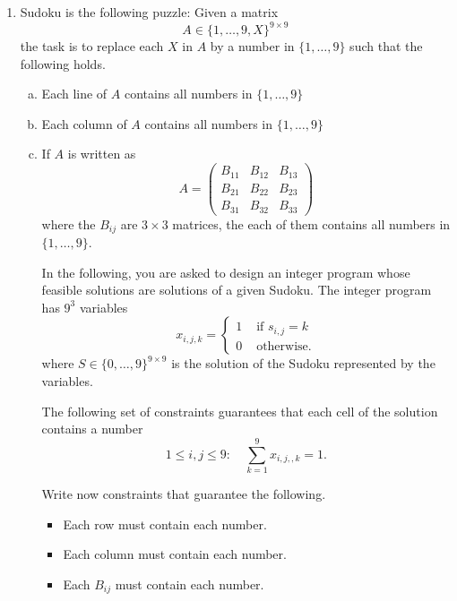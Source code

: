 \documentclass[11pt]{article}
\institute{\'Ecole Polytechnique F\'ed\'erale de Lausanne}
\begin{document}
\makeheader

\begin{enumerate}[1)]


\item Sudoku is the following puzzle: Given a matrix
  \begin{displaymath}
    A ∈ \{1,\dots,9,X\}^{9 ×9} 
  \end{displaymath}
  the task is to replace each $X$ in $A$ by a number in $\{1,\dots,9\}$ such that the following holds.
  \begin{enumerate}[a)] 
  \item Each line of $A$ contains all numbers in  $\{1,\dots,9\}$
  \item Each column of $A$ contains all numbers in  $\{1,\dots,9\}$
  \item If $A$ is written as
    \begin{displaymath}
      A =
      \begin{pmatrix}
        B_{11} & B_{12} & B_{13} \\
        B_{21} & B_{22} & B_{23} \\
        B_{31} & B_{32} & B_{33} 
      \end{pmatrix}
    \end{displaymath}
    where the $B_{ij}$ are $3 ×3$ matrices, the each of them contains all numbers in  $\{1,\dots,9\}$.

    \bigskip \noindent

    In the following, you are asked to design an integer program whose feasible solutions are solutions of a given Sudoku. The integer program has $9^3$ variables
    \begin{displaymath}
      x_{i,j,k} =
      \begin{cases}
        1 & \text{ if } s_{i,j} = k \\
        0 & \text{ otherwise.} 
      \end{cases}
    \end{displaymath}
    where $S ∈ \{0,\dots,9\}^{9 ×9}$ is the solution of the Sudoku represented by the variables. 


    The following set of constraints guarantees that each cell of the solution contains a number
    \begin{displaymath}
      1≤i,j≤9: \quad  ∑_{k=1}^9 x_{i,j,,k} = 1. 
    \end{displaymath}

    Write now constraints that guarantee the following.
    \begin{itemize}
    \item Each row must contain each number.
    \item Each column must contain each number.
    \item Each $B_{ij}$ must contain each number. 
    \end{itemize}


\end{enumerate}
\end{enumerate}
\end{document}
